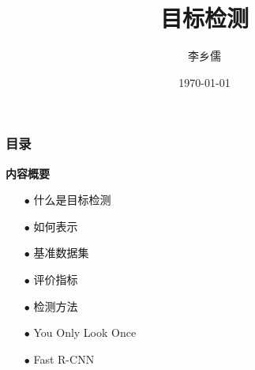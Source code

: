 \documentclass{beamer}%
\title[目标检测]{目标检测}
\author{\large 李乡儒} %
\institute[SCNU]{\small
华南师范大学计算机学院
}
\date{\today}
\begin{document}
\graphicspath{{figures/}}

\begin{frame}%
    \titlepage
\end{frame}

\begin{frame}[allowframebreaks]
    \frametitle{\textsc{目录}} \vspace{-0.3cm}
    \begin{spacing}{0.0}
        \tableofcontents[hideallsubsections]
    \end{spacing}   %
\end{frame}

\begin{frame}[allowframebreaks]
    \vspace{-0.2cm}
    {\noindent\large\textbf{内容概要}}
    \vspace{0.4cm}
    \begin{itemize}
        \item[$ \bullet $] 什么是目标检测
        \item[$ \bullet $] 如何表示
        \item[$ \bullet $] 基准数据集
        \item[$ \bullet $] 评价指标
        \item[$ \bullet $] 检测方法
        \item[$ \bullet $] You Only Look Once
        \item[$ \bullet $] Fast R-CNN
    \end{itemize}

\end{frame}









\end{document}
